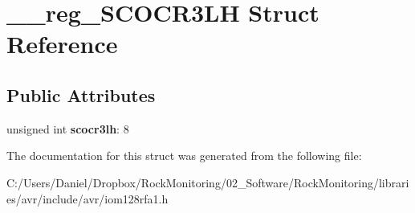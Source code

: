 \hypertarget{struct____reg___s_c_o_c_r3_l_h}{}\section{\+\_\+\+\_\+reg\+\_\+\+S\+C\+O\+C\+R3\+LH Struct Reference}
\label{struct____reg___s_c_o_c_r3_l_h}
\subsection*{Public Attributes}
\begin{DoxyCompactItemize}
\item 
unsigned int {\bfseries scocr3lh}\+: 8\hypertarget{struct____reg___s_c_o_c_r3_l_h_a57ccc21c528189399499d93ee580191f}{}\label{struct____reg___s_c_o_c_r3_l_h_a57ccc21c528189399499d93ee580191f}

\end{DoxyCompactItemize}


The documentation for this struct was generated from the following file\+:\begin{DoxyCompactItemize}
\item 
C\+:/\+Users/\+Daniel/\+Dropbox/\+Rock\+Monitoring/02\+\_\+\+Software/\+Rock\+Monitoring/libraries/avr/include/avr/iom128rfa1.\+h\end{DoxyCompactItemize}
